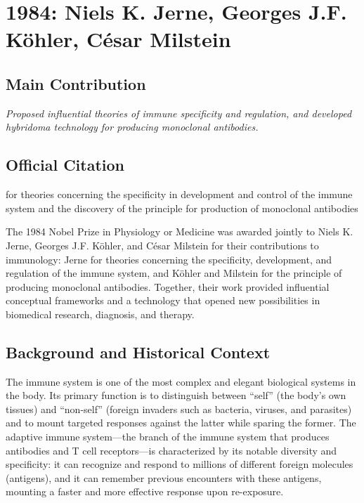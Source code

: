 \chapter[1984 --- Jerne et al.]{1984: Niels K. Jerne, Georges J.F. K\"ohler, C\'esar Milstein}
\label{ch:1984_Jerne}

\section*{Main Contribution}

\textit{Proposed influential theories of immune specificity and regulation, and developed hybridoma technology for producing monoclonal antibodies.}\cite{nobel-1984,lecture-1984,lecture-kohler-1984,lecture-milstein-1984}

\section{Official Citation}

for theories concerning the specificity in development and control of the immune system and the discovery of the principle for production of monoclonal antibodies

The 1984 Nobel Prize in Physiology or Medicine was awarded jointly to Niels K. Jerne, Georges J.F. K\"ohler, and C\'esar Milstein for their contributions to immunology: Jerne for theories concerning the specificity, development, and regulation of the immune system, and K\"ohler and Milstein for the principle of producing monoclonal antibodies. Together, their work provided influential conceptual frameworks and a technology that opened new possibilities in biomedical research, diagnosis, and therapy.

\section{Background and Historical Context}

The immune system is one of the most complex and elegant biological systems in the body. Its primary function is to distinguish between ``self'' (the body's own tissues) and ``non-self'' (foreign invaders such as bacteria, viruses, and parasites) and to mount targeted responses against the latter while sparing the former. The adaptive immune system---the branch of the immune system that produces antibodies and T cell receptors---is characterized by its notable diversity and specificity: it can recognize and respond to millions of different foreign molecules (antigens), and it can remember previous encounters with these antigens, mounting a faster and more effective response upon re-exposure.

